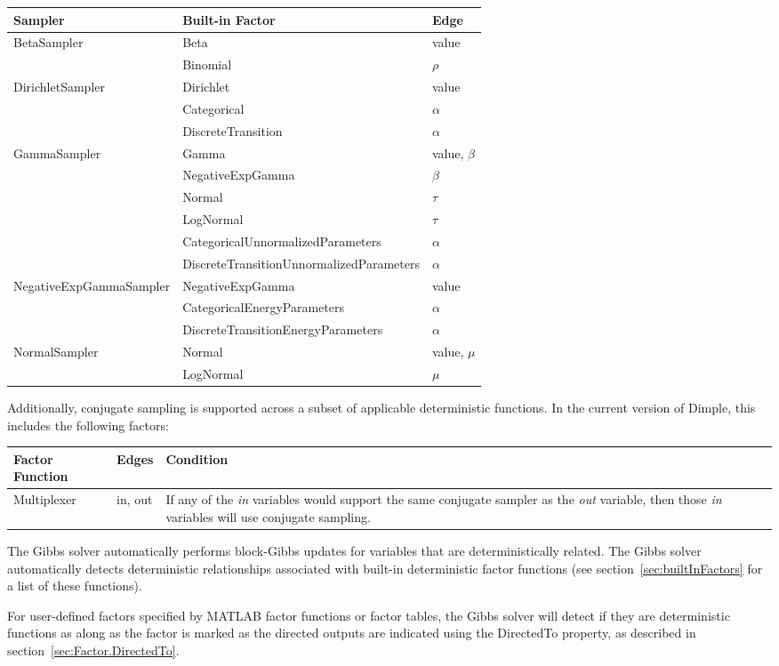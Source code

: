 \begin{longtable} {l p{7.1cm} p{2.5cm}}
Sampler & Built-in Factor & Edge \\
\hline
\endhead
BetaSampler & Beta & value \\
 & Binomial & $\rho$ \\
DirichletSampler & Dirichlet & value \\
 & Categorical & $\alpha$ \\
 & DiscreteTransition & $\alpha$ \\
GammaSampler & Gamma & value, $\beta$ \\
 & NegativeExpGamma & $\beta$ \\
 & Normal & $\tau$ \\
 & LogNormal & $\tau$ \\
 & CategoricalUnnormalizedParameters & $\alpha$ \\
 & DiscreteTransitionUnnormalizedParameters & $\alpha$ \\
NegativeExpGammaSampler & NegativeExpGamma & value \\
 & CategoricalEnergyParameters & $\alpha$ \\ 
 & DiscreteTransitionEnergyParameters & $\alpha$ \\ 
NormalSampler & Normal & value, $\mu$ \\
 & LogNormal & $\mu$ \\
\end{longtable}

Additionally, conjugate sampling is supported across a subset of applicable deterministic functions.  In the current version of Dimple, this includes the following factors:

\begin{longtable} {l p{2cm} p{9cm}}
Factor Function & Edges & Condition \\
\hline
\endhead
Multiplexer & in, out & If any of the \emph{in} variables would support the same conjugate sampler as the \emph{out} variable, then those \emph{in} variables will use conjugate sampling. \\
\end{longtable}


The Gibbs solver automatically performs block-Gibbs updates for variables that are deterministically related.  The Gibbs solver automatically detects deterministic relationships associated with built-in deterministic factor functions (see section~\ref{sec:builtInFactors} for a list of these functions).  

\ifmatlab
For user-defined factors specified by MATLAB factor functions or factor tables, the Gibbs solver will detect if they are deterministic functions as along as the factor is marked as the directed outputs are indicated using the DirectedTo property, as described in section~\ref{sec:Factor.DirectedTo}.
\fi

